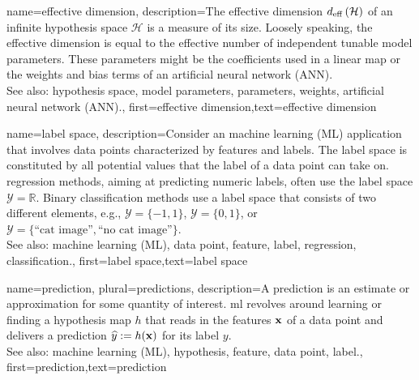 {name={effective dimension},
	description={The effective dimension $d_{\rm eff} \left( \mathcal{H} \right)$ of 
		an infinite hypothesis space $\mathcal{H}$ is a measure of its size. Loosely speaking, the 
		effective dimension is equal to the effective number of independent tunable model parameters. 
		These parameters might be the coefficients used in a linear map or the 
		weights and bias terms of an artificial neural network (ANN).
					\\ 
		See also: hypothesis space, model parameters, parameters, weights, artificial neural network (ANN).},
	first={effective dimension},text={effective dimension}  
}

{name={label space},
	description={Consider an machine learning (ML) application that involves data points characterized by features 
		and labels. The label space is constituted by all potential values that the label 
		of a data point can take on. \Gls{regression} methods, aiming at predicting numeric labels, often
		 use the label space $\mathcal{Y} = \mathbb{R}$. Binary classification methods use a label space 
 		that consists of two different elements, e.g., $\mathcal{Y} =\{-1,1\}$, $\mathcal{Y}=\{0,1\}$, 
		or $\mathcal{Y} = \{ \mbox{``cat image''}, \mbox{``no cat image''} \}$.
					\\ 
		See also: machine learning (ML), data point, feature, label, regression, classification.}, first={label space},text={label space}  
}

{name={prediction}, plural={predictions},
	description={A prediction is an estimate or approximation for some 
		quantity of interest. \Gls{ml} revolves around learning or finding a hypothesis map $h$ 
		that reads in the features ${\bf x}$ of a data point and delivers a prediction 
		$\widehat{y} := h({\bf x})$ for its label $y$.
					\\ 
		See also: machine learning (ML), hypothesis, feature, data point, label.},
	first={prediction},text={prediction}  
}


